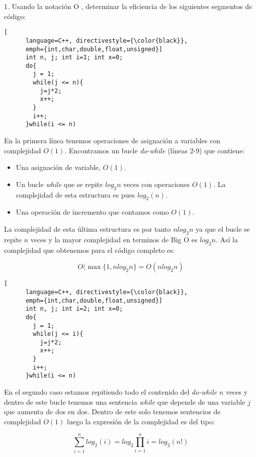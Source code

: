 
\begin{ejercicio}
  {1. Usando la notación O , determinar la eficiencia de los siguientes segmentos de
    código:}

  \begin{lstlisting}[
      language=C++, directivestyle={\color{black}},
      emph={int,char,double,float,unsigned}]
      int n, j; int i=1; int x=0;
      do{
        j = 1;
        while(j <= n){
          j=j*2;
          x++;
        }
        i++;
      }while(i <= n)
    \end{lstlisting}

    \begin{flushleft}
      En la primera línea tenemos operaciones de asignación a
      variables con complejidad $O(1)$. Encontramos un bucle
      \textit{do-while} (líneas 2-9) que contiene:
    \end{flushleft}


    \begin{itemize}
    \item Una asignación de variable, $O(1)$.
    \item Un bucle \textit{while} que se repite $log_2n$ veces con
      operaciones $O(1)$. La complejidad de esta estructura es pues
      $log_2(n)$.
    \item Una operación de incremento que contamos como $O(1)$.
    \end{itemize}

    \begin{flushleft}
      La complejidad de esta última estructura es por tanto $nlog_2n$
      ya que el bucle se repite $n$ veces y la mayor complejidad en
      terminos de Big O es $log_2n$.  Así la complejidad que obtenemos
      para el código completo es:
    \end{flushleft}

    \[
      O(\max\{1, nlog_2n\} = O(nlog_2n)
    \]

     \begin{lstlisting}[
      language=C++, directivestyle={\color{black}},
      emph={int,char,double,float,unsigned}]
      int n, j; int i=2; int x=0;
      do{
        j = 1;
        while(j <= i){
          j=j*2;
          x++;
        }
        i++;
      }while(i <= n)
    \end{lstlisting}

    \begin{flushleft}
      En el segundo caso estamos repitiendo todo el contenido del
      \textit{do-while} $n$ veces y dentro de este bucle tenemos una
      sentencia \textit{while} que depende de una variable $j$ que aumenta
      de dos en dos. Dentro de este solo tenemos sentencios de complejidad $O(1)$
      luego la expresión de la complejidad es del tipo:
    \end{flushleft}


  \[
    \sum\limits_{i=1}^{n}{log_2(i)} = log_2{\prod\limits_{i=1}^{n}i} = log_2(n!)
  \]


\end{ejercicio}
